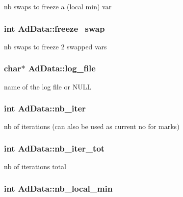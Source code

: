 nb swaps to freeze a (local min) var \hypertarget{classAdData_a81ecb44f370042dbc83a2fe0d55a8919}{
\subsubsection[{freeze\-\_\-swap}]{\setlength{\rightskip}{0pt plus 5cm}int {\bf \-Ad\-Data\-::freeze\-\_\-swap}}}\label{classAdData_a81ecb44f370042dbc83a2fe0d55a8919}
nb swaps to freeze 2 swapped vars \hypertarget{classAdData_ad143f3006862ac20445480279ecc119b}{
\subsubsection[{log\-\_\-file}]{\setlength{\rightskip}{0pt plus 5cm}char$\ast$ {\bf \-Ad\-Data\-::log\-\_\-file}}}\label{classAdData_ad143f3006862ac20445480279ecc119b}
name of the log file or \-N\-U\-L\-L \hypertarget{classAdData_a45ba53841157b7dbf71efd8b39e2da1c}{
\subsubsection[{nb\-\_\-iter}]{\setlength{\rightskip}{0pt plus 5cm}int {\bf \-Ad\-Data\-::nb\-\_\-iter}}}\label{classAdData_a45ba53841157b7dbf71efd8b39e2da1c}
nb of iterations (can also be used as current no for marks) \hypertarget{classAdData_a8912ef6d4f9041a6ccf8a5e2f2ca8789}{
\subsubsection[{nb\-\_\-iter\-\_\-tot}]{\setlength{\rightskip}{0pt plus 5cm}int {\bf \-Ad\-Data\-::nb\-\_\-iter\-\_\-tot}}}\label{classAdData_a8912ef6d4f9041a6ccf8a5e2f2ca8789}
nb of iterations total \hypertarget{classAdData_a1f285bdad8c77fd7d030456571eb413b}{
\subsubsection[{nb\-\_\-local\-\_\-min}]{\setlength{\rightskip}{0pt plus 5cm}int {\bf \-Ad\-Data\-::nb\-\_\-local\-\_\-min}}}\label{classAdData_a1f285bdad8c77fd7d030456571eb413b}
